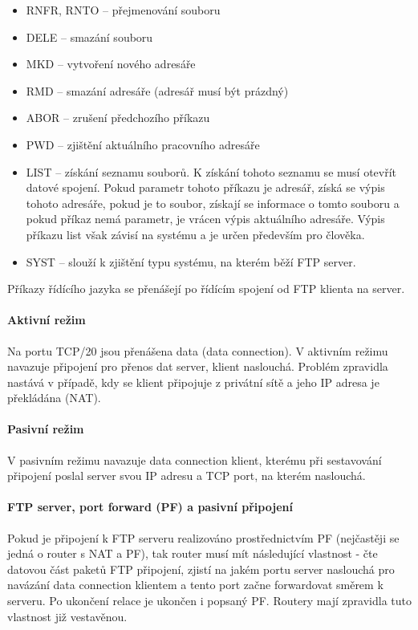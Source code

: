 \documentclass[10pt,a4paper]{article}
\begin{document}
\begin{itemize}
\begin{itemize}
\begin{itemize}
		\end{itemize}
		\item RNFR, RNTO – přejmenování souboru
		\item DELE – smazání souboru
		\item MKD – vytvoření nového adresáře
		\item RMD – smazání adresáře (adresář musí být prázdný)
		\item ABOR – zrušení předchozího příkazu
		\item PWD – zjištění aktuálního pracovního adresáře
		\item LIST – získání seznamu souborů. K získání tohoto seznamu se musí otevřít datové spojení. Pokud parametr tohoto příkazu je adresář, získá se výpis tohoto adresáře, pokud je to soubor, získají se informace o tomto souboru a pokud příkaz nemá parametr, je vrácen výpis aktuálního adresáře. Výpis příkazu list však závisí na systému a je určen především pro člověka.
		\item SYST – slouží k zjištění typu systému, na kterém běží FTP server.
	\end{itemize}
\end{itemize}
Příkazy řídícího jazyka se přenášejí po řídícím spojení od FTP klienta na server.
\paragraph{Aktivní režim} Na portu TCP/20 jsou přenášena data (data connection). V aktivním režimu navazuje připojení pro přenos dat server, klient naslouchá. Problém zpravidla nastává v případě, kdy se klient připojuje z privátní sítě a jeho IP adresa je překládána (NAT).
\paragraph{Pasivní režim} V pasivním režimu navazuje data connection klient, kterému při sestavování připojení poslal server svou IP adresu a TCP port, na kterém naslouchá.
\paragraph{FTP server, port forward (PF) a pasivní připojení} Pokud je připojení k FTP serveru realizováno prostřednictvím PF (nejčastěji se jedná o router s NAT a PF), tak router musí mít následující vlastnost - čte datovou část paketů FTP připojení, zjistí na jakém portu server naslouchá pro navázání data connection klientem a tento port začne forwardovat směrem k serveru. Po ukončení relace je ukončen i popsaný PF. Routery mají zpravidla tuto vlastnost již vestavěnou.
\end{document}
